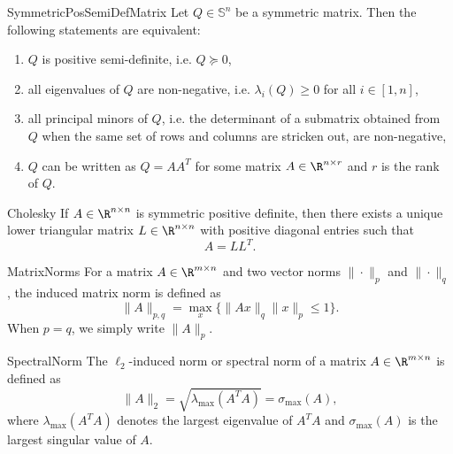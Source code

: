 \begin{theo}{SymmetricPosSemiDefMatrix}
    Let $Q \in \mathbb{S}^n$ be a symmetric matrix. Then the following statements are equivalent:
    \begin{enumerate}
        \item $Q$ is positive semi-definite, i\@.e\@. $Q \succeq 0$,
        \item all eigenvalues of $Q$ are non-negative, i\@.e\@. $\lambda_i(Q) \geq 0$ for all $i \in [1,n]$,
        \item all principal minors of $Q$, i\@.e\@. the determinant of a submatrix obtained from $Q$ when the same set of rows and columns are stricken out, are non-negative,
        \item $Q$ can be written as $Q = AA^T$ for some matrix $A \in \R^{n \times r}$ and $r$ is the rank of $Q$.
    \end{enumerate}
    \vspace*{-0.3cm}
\end{theo}

\begin{theo}{Cholesky}
    If $A \in \R^{n \times n}$ is symmetric positive definite, then there exists a unique lower triangular matrix $L \in \R^{n \times n}$ with positive diagonal entries such that
    \begin{equation*}
        A = LL^T.
    \end{equation*}
    \vspace*{-0.5cm}
\end{theo}

\begin{theo}{MatrixNorms}
    For a matrix $A \in \R^{m \times n}$ and two vector norms $\|\cdot\|_p$ and $\|\cdot\|_q$, the induced matrix norm is defined as 
    \begin{equation*}
        \|A\|_{p,q} = \max_{x} \{ \|Ax\|_q \|x\|_p \leq 1 \}.
    \end{equation*}
    When $p = q$, we simply write $\|A\|_p$. 
\end{theo}

\begin{ex}{SpectralNorm}
    The $\ell_2$-induced norm or spectral norm of a matrix $A \in \R^{m \times n}$ is defined as
    \begin{equation*}
        \|A\|_2 = \sqrt{\lambda_{\max}(A^T A)} = \sigma_{\max}(A),
    \end{equation*}
    where $\lambda_{\max}(A^T A)$ denotes the largest eigenvalue of $A^T A$ and $\sigma_{\max}(A)$ is the largest singular value of $A$.
\end{ex}

